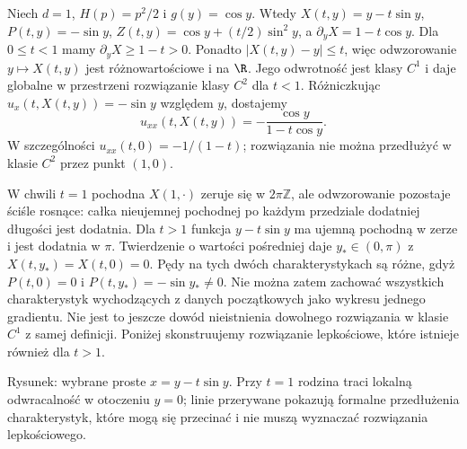 \begin{przyklad}
\label{ex:pde23-cos}
Niech $d=1$, $H(p)=p^2/2$ i $g(y)=\cos y$. Wtedy
$X(t,y)=y-t\sin y$, $P(t,y)=-\sin y$,
$Z(t,y)=\cos y+(t/2)\sin^2 y$,
a $\partial_yX=1-t\cos y$.
Dla $0\le t<1$ mamy $\partial_yX\ge1-t>0$.
Ponadto $|X(t,y)-y|\le t$, więc odwzorowanie
$y\mapsto X(t,y)$ jest różnowartościowe i na $\R$.
Jego odwrotność jest klasy $C^1$ i daje globalne
w przestrzeni rozwiązanie klasy $C^2$ dla $t<1$.
Różniczkując $u_x(t,X(t,y))=-\sin y$
względem $y$, dostajemy
\[
 u_{xx}(t,X(t,y))=-\frac{\cos y}{1-t\cos y}.
\]
W szczególności $u_{xx}(t,0)=-1/(1-t)$;
rozwiązania nie można przedłużyć w klasie $C^2$
przez punkt $(1,0)$.

W chwili $t=1$ pochodna $X(1,\cdot)$ zeruje się
w $2\pi\mathbb Z$, ale odwzorowanie pozostaje ściśle
rosnące: całka nieujemnej pochodnej po każdym
przedziale dodatniej długości jest dodatnia.
Dla $t>1$ funkcja $y-t\sin y$ ma ujemną pochodną
w zerze i jest dodatnia w $\pi$. Twierdzenie
o wartości pośredniej daje $y_*\in(0,\pi)$
z $X(t,y_*)=X(t,0)=0$.
Pędy na tych dwóch charakterystykach są różne,
gdyż $P(t,0)=0$ i $P(t,y_*)=-\sin y_*\ne0$.
Nie można zatem zachować wszystkich charakterystyk
wychodzących z danych początkowych jako wykresu
jednego gradientu. Nie jest to jeszcze dowód
nieistnienia dowolnego rozwiązania w klasie $C^1$
z samej definicji. Poniżej skonstruujemy rozwiązanie
lepkościowe, które istnieje również dla $t>1$.
\end{przyklad}

\begin{center}

\small Rysunek: wybrane proste $x=y-t\sin y$.
Przy $t=1$ rodzina traci lokalną odwracalność w otoczeniu
$y=0$; linie przerywane pokazują formalne przedłużenia
charakterystyk, które mogą się przecinać i nie muszą
wyznaczać rozwiązania lepkościowego.
\end{center}

